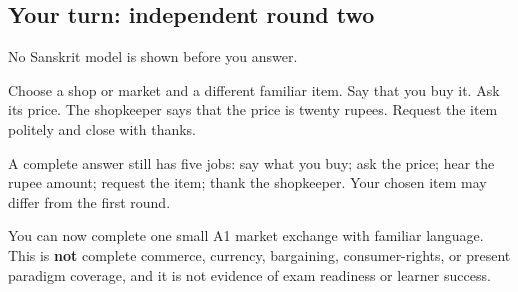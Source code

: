\subsection*{Your turn: independent round two}
No Sanskrit model is shown before you answer.

Choose a shop or market and a different familiar item. Say that you buy it. Ask its price. The shopkeeper says that the price is twenty rupees. Request the item politely and close with thanks.

\begin{grammarlens}[title={What you've built: check after speaking}]
A complete answer still has five jobs: say what you buy; ask the price; hear the rupee amount; request the item; thank the shopkeeper. Your chosen item may differ from the first round.
\end{grammarlens}

\begin{tcolorbox}[breakable,colback=teal!4,colframe=teal!35!black,title={Before you move on}]
You can now complete one small A1 market exchange with familiar language. This is \textbf{not} complete commerce, currency, bargaining, consumer-rights, or present paradigm coverage, and it is not evidence of exam readiness or learner success.
\end{tcolorbox}
